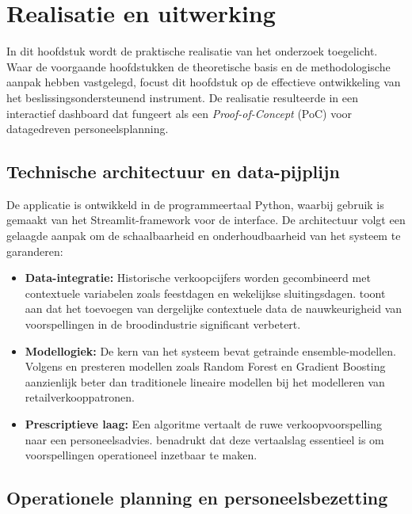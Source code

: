 \chapter{Realisatie en uitwerking}
\label{ch:realisatie}

In dit hoofdstuk wordt de praktische realisatie van het onderzoek toegelicht. Waar de voorgaande hoofdstukken de theoretische basis en de methodologische aanpak hebben vastgelegd, focust dit hoofdstuk op de effectieve ontwikkeling van het beslissingsondersteunend instrument. De realisatie resulteerde in een interactief dashboard dat fungeert als een \textit{Proof-of-Concept} (PoC) voor datagedreven personeelsplanning.

\section{Technische architectuur en data-pijplijn}
\label{sec:architectuur}

De applicatie is ontwikkeld in de programmeertaal Python, waarbij gebruik is gemaakt van het Streamlit-framework voor de interface. De architectuur volgt een gelaagde aanpak om de schaalbaarheid en onderhoudbaarheid van het systeem te garanderen:

\begin{itemize}
    \item \textbf{Data-integratie:} Historische verkoopcijfers worden gecombineerd met contextuele variabelen zoals feestdagen en wekelijkse sluitingsdagen. \cite{Geboers2012} toont aan dat het toevoegen van dergelijke contextuele data de nauwkeurigheid van voorspellingen in de broodindustrie significant verbetert.
    \item \textbf{Modellogiek:} De kern van het systeem bevat getrainde ensemble-modellen. Volgens \cite{GangulyMukherjee2024} en \cite{Kang2023} presteren modellen zoals Random Forest en Gradient Boosting aanzienlijk beter dan traditionele lineaire modellen bij het modelleren van retailverkooppatronen.
    \item \textbf{Prescriptieve laag:} Een algoritme vertaalt de ruwe verkoopvoorspelling naar een personeelsadvies. \cite{Geboers2012} benadrukt dat deze vertaalslag essentieel is om voorspellingen operationeel inzetbaar te maken.
\end{itemize}

\section{Operationele planning en personeelsbezetting}
\label{sec:planning}

